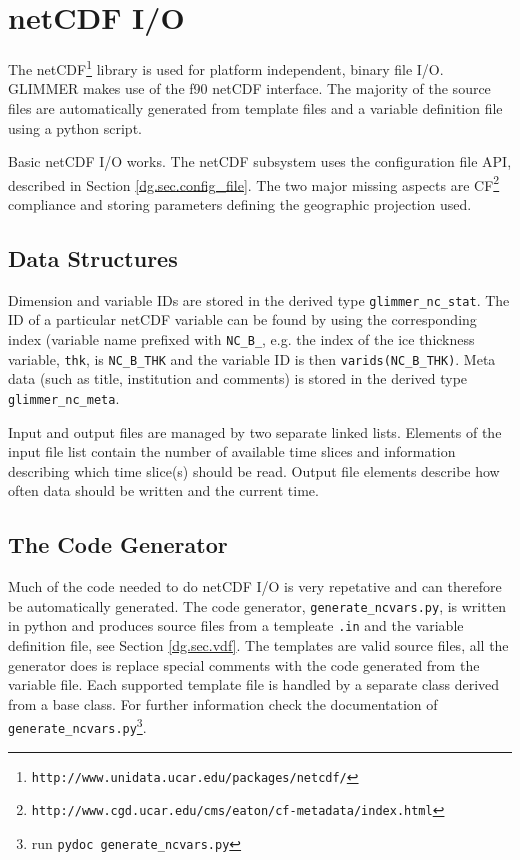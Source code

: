 \section{netCDF I/O}
The netCDF\footnote{\texttt{http://www.unidata.ucar.edu/packages/netcdf/}} library is used for platform independent, binary file I/O. GLIMMER makes use of the f90 netCDF interface. The majority of the source files are automatically generated from template files and a variable definition file using a python script.

Basic netCDF I/O works. The netCDF subsystem uses the configuration file API, described in Section \ref{dg.sec.config_file}. The two major missing aspects are CF\footnote{\texttt{http://www.cgd.ucar.edu/cms/eaton/cf-metadata/index.html}} compliance and storing parameters defining the geographic projection used.

\subsection{Data Structures}
Dimension and variable IDs are stored in the derived type \texttt{glimmer\_nc\_stat}. The ID of a particular netCDF variable can be found by using the corresponding index (variable name prefixed with \texttt{NC\_B\_}, e.g. the index of the ice thickness variable, \texttt{thk}, is \texttt{NC\_B\_THK} and the variable ID is then \texttt{varids(NC\_B\_THK)}. Meta data (such as title, institution and comments) is stored in the derived type \texttt{glimmer\_nc\_meta}.

Input and output files are managed by two separate linked lists. Elements of the input file list contain the number of available time slices and information describing which time slice(s) should be read. Output file elements describe how often data should be written and the current time.

\subsection{The Code Generator}
Much of the code needed to do netCDF I/O is very repetative and can therefore be automatically generated. The code generator, \texttt{generate\_ncvars.py}, is written in python and produces source files from a templeate \texttt{.in} and the variable definition file, see Section \ref{dg.sec.vdf}. The templates are valid source files, all the generator does is replace special comments with the code generated from the variable file. Each supported template file is handled by a separate class derived from a base class. For further information check the documentation of \texttt{generate\_ncvars.py}\footnote{run \texttt{pydoc generate\_ncvars.py}}.

